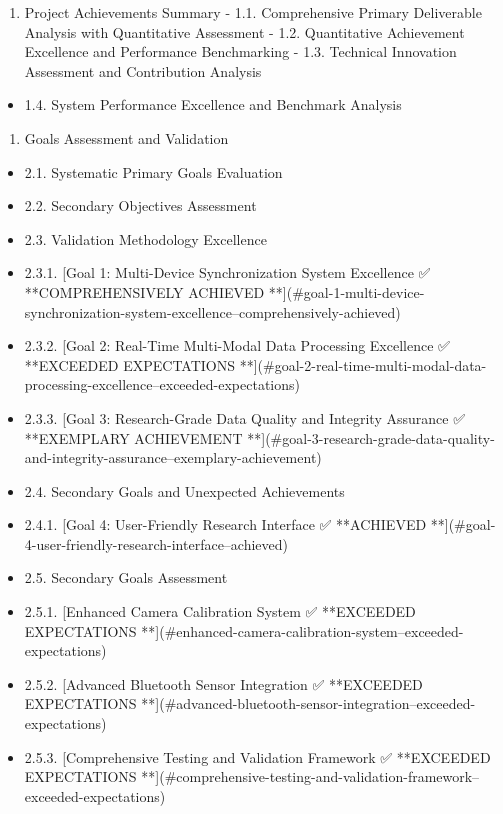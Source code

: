 \documentclass[11pt,a4paper]{report}
\begin{document}
\begin{enumerate}
\item Project Achievements Summary
    -
    1.1. Comprehensive Primary Deliverable Analysis with Quantitative Assessment
    -
    1.2. Quantitative Achievement Excellence and Performance Benchmarking
    -
    1.3. Technical Innovation Assessment and Contribution Analysis
\end{enumerate}
\begin{itemize}
\item 1.4. System Performance Excellence and Benchmark Analysis
\end{itemize}
\begin{enumerate}
\item Goals Assessment and Validation
\end{enumerate}
\begin{itemize}
\item 2.1. Systematic Primary Goals Evaluation
\item 2.2. Secondary Objectives Assessment
\item 2.3. Validation Methodology Excellence
\item 2.3.1. [Goal 1: Multi-Device Synchronization System Excellence ✅ **COMPREHENSIVELY ACHIEVED
          **](\#goal-1-multi-device-synchronization-system-excellence--comprehensively-achieved)
\item 2.3.2. [Goal 2: Real-Time Multi-Modal Data Processing Excellence ✅ **EXCEEDED EXPECTATIONS
          **](\#goal-2-real-time-multi-modal-data-processing-excellence--exceeded-expectations)
\item 2.3.3. [Goal 3: Research-Grade Data Quality and Integrity Assurance ✅ **EXEMPLARY ACHIEVEMENT
          **](\#goal-3-research-grade-data-quality-and-integrity-assurance--exemplary-achievement)
\item 2.4. Secondary Goals and Unexpected Achievements
\item 2.4.1. [Goal 4: User-Friendly Research Interface ✅ **ACHIEVED
          **](\#goal-4-user-friendly-research-interface--achieved)
\item 2.5. Secondary Goals Assessment
\item 2.5.1. [Enhanced Camera Calibration System ✅ **EXCEEDED EXPECTATIONS
          **](\#enhanced-camera-calibration-system--exceeded-expectations)
\item 2.5.2. [Advanced Bluetooth Sensor Integration ✅ **EXCEEDED EXPECTATIONS
          **](\#advanced-bluetooth-sensor-integration--exceeded-expectations)
\item 2.5.3. [Comprehensive Testing and Validation Framework ✅ **EXCEEDED EXPECTATIONS
          **](\#comprehensive-testing-and-validation-framework--exceeded-expectations)
\end{itemize}
\end{document}
